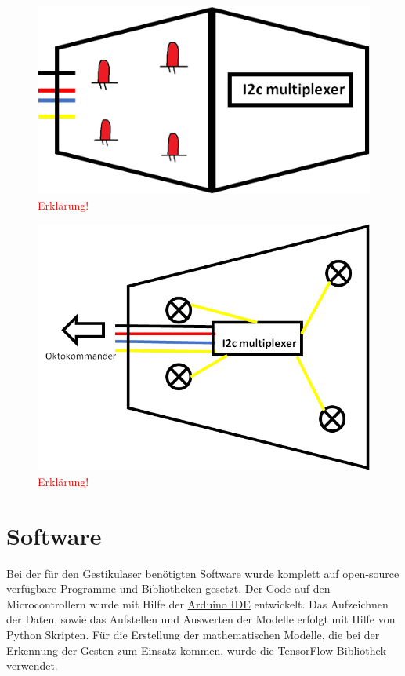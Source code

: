 \begin{figure}[h]
	\centering
	\includegraphics[scale=0.7]{figures/DetektormodulOffen.png}
	\caption{\textcolor{red}{Erklärung!}}
	\label{fig:DetektormodulOffen}
\end{figure}

\begin{figure}[h]
	\centering
	\includegraphics[scale=0.5]{figures/PrinzipskizzeDetektormodul.png}
	\caption{\textcolor{red}{Erklärung!}}
	\label{fig:PrinzipskizzeDetektormodul}
\end{figure}


\section{Software}
\label{sec:Software}

Bei der für den Gestikulaser benötigten Software wurde komplett auf open-source verfügbare Programme und Bibliotheken gesetzt. Der Code auf den Microcontrollern wurde mit Hilfe der \href{https://www.arduino.cc/en/Main/Software}{Arduino IDE} entwickelt. Das Aufzeichnen der Daten, sowie das Aufstellen und Auswerten der Modelle erfolgt mit Hilfe von Python Skripten. Für die Erstellung der mathematischen Modelle, die bei der Erkennung der Gesten zum Einsatz kommen, wurde die \href{https://www.tensorflow.org/}{TensorFlow\texttrademark} Bibliothek verwendet.